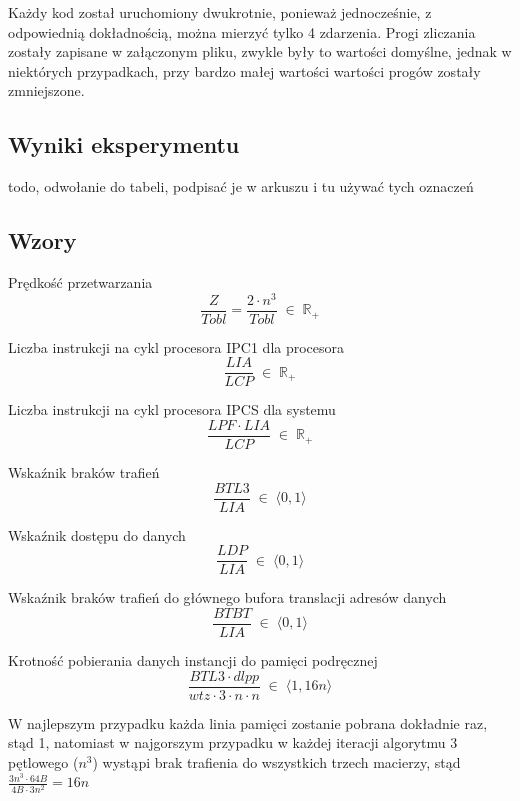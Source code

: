 \documentclass[12pt,a4paper]{article}
\begin{document}
Każdy kod został uruchomiony dwukrotnie, ponieważ jednocześnie, z odpowiednią dokładnością, można mierzyć tylko 4 zdarzenia. Progi zliczania zostały zapisane w załączonym pliku, zwykle były to wartości domyślne, jednak w niektórych przypadkach, przy bardzo małej wartości wartości progów zostały zmniejszone.

\subsection{Wyniki eksperymentu}

todo, odwołanie do tabeli, podpisać je w arkuszu i tu używać tych oznaczeń

\subsection{Wzory}

Prędkość przetwarzania
\begin{equation}
\frac{Z}{Tobl} = \frac{2 \cdot n^3}{Tobl} \; \in \; \mathbb{R}_+
\end{equation}

Liczba instrukcji na cykl procesora IPC1 dla procesora
\begin{equation}
\frac{LIA}{LCP} \; \in \; \mathbb{R}_+
\end{equation}

Liczba instrukcji na cykl procesora IPCS dla systemu
\begin{equation}
\frac{LPF \cdot LIA}{LCP}
\; \in \; \mathbb{R}_+
\end{equation}

Wskaźnik braków trafień
\begin{equation}
\frac{BTL3}{LIA}
\; \in \; \langle 0,1 \rangle
\end{equation}

Wskaźnik dostępu do danych
\begin{equation}
\frac{LDP}{LIA}
\; \in \; \langle 0,1 \rangle
\end{equation}

Wskaźnik braków trafień do głównego bufora translacji adresów danych
\begin{equation}
\frac{BTBT}{LIA}
\; \in \; \langle 0,1 \rangle
\end{equation}

Krotność pobierania danych instancji do pamięci podręcznej
\begin{equation}
\frac{BTL3 \cdot dlpp}{wtz \cdot 3 \cdot n \cdot n}
\; \in \; \langle 1,16n \rangle
\end{equation}
\begin{footnotesize}
\begin{center}
W najlepszym przypadku każda linia pamięci zostanie pobrana dokładnie raz, stąd 1, natomiast w najgorszym przypadku w każdej iteracji algorytmu 3 pętlowego ($n^3$) wystąpi brak trafienia do wszystkich trzech macierzy, stąd $\frac{3n^3 \cdot 64B}{4B \cdot 3n^2} = 16n$
\end{center}
\end{footnotesize}
\end{document}
